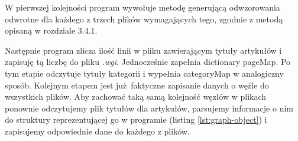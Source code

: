 W pierwszej kolejności program wywołuje metodę generującą odwzorowania odwrotne dla każdego z trzech plików wymagających tego, zgodnie z metodą opisaną w rozdziale 3.4.1.

Następnie program zlicza ilość linii w pliku zawierającym tytuły artykułów i zapisuję tą liczbę do pliku \textit{.wgi}. Jednocześnie zapełnia dictionary pageMap. Po tym etapie odczytuje tytuły kategorii i wypełnia categoryMap w analogiczny sposób.\newline
Kolejnym etapem jest już faktyczne zapisanie danych o węźle do wszystkich plików. Aby zachować taką samą kolejność węzłów w plikach ponownie odczytujemy plik tytułów dla artykułów, parsujemy informacje o nim do struktury reprezentującej go w programie (listing \ref{lst:graph-object}) i zapisujemy odpowiednie dane do każdego z plików.
\newline

